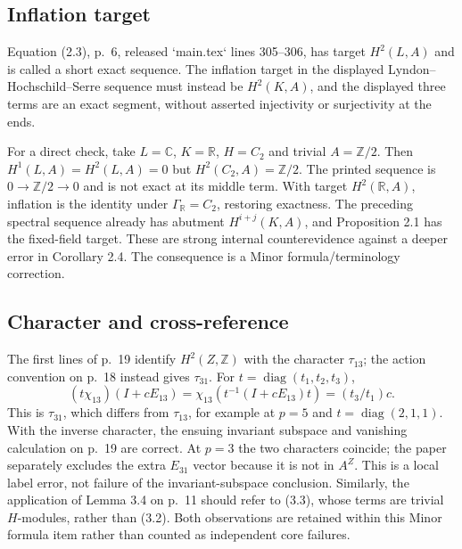 \documentclass[10pt]{article}
\begin{document}
\subsection*{Inflation target}
Equation (2.3), p. 6, released `main.tex` lines 305–306, has target \(H^2(L,A)\) and is called a short exact sequence. The inflation target in the displayed Lyndon–Hochschild–Serre sequence must instead be \(H^2(K,A)\), and the displayed three terms are an exact segment, without asserted injectivity or surjectivity at the ends.\par
For a direct check, take \(L=\mathbb C\), \(K=\mathbb R\), \(H=C_2\) and trivial \(A=\mathbb Z/2\). Then \(H^1(L,A)=H^2(L,A)=0\) but \(H^2(C_2,A)=\mathbb Z/2\). The printed sequence is \(0\to\mathbb Z/2\to0\) and is not exact at its middle term. With target \(H^2(\mathbb R,A)\), inflation is the identity under \(\Gamma_\mathbb R=C_2\), restoring exactness. The preceding spectral sequence already has abutment \(H^{i+j}(K,A)\), and Proposition 2.1 has the fixed-field target. These are strong internal counterevidence against a deeper error in Corollary 2.4. The consequence is a Minor formula/terminology correction.\par
\subsection*{Character and cross-reference}
The first lines of p. 19 identify \(H^2(Z,\mathbb Z)\) with the character \(\tau_{13}\); the action convention on p. 18 instead gives \(\tau_{31}\). For \(t=\operatorname{diag}(t_1,t_2,t_3)\), \[(t\chi_{13})(I+cE_{13})=\chi_{13}(t^{-1}(I+cE_{13})t)
=(t_3/t_1)c .\] This is \(\tau_{31}\), which differs from \(\tau_{13}\), for example at \(p=5\) and \(t=\operatorname{diag}(2,1,1)\). With the inverse character, the ensuing invariant subspace and vanishing calculation on p. 19 are correct. At \(p=3\) the two characters coincide; the paper separately excludes the extra \(E_{31}\) vector because it is not in \(A^Z\). This is a local label error, not failure of the invariant-subspace conclusion. Similarly, the application of Lemma 3.4 on p. 11 should refer to (3.3), whose terms are trivial \(H\)-modules, rather than (3.2). Both observations are retained within this Minor formula item rather than counted as independent core failures.\par
\end{document}
